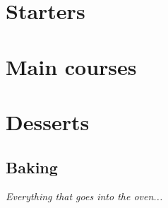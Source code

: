 \documentclass[11pt,paper=a4]{scrbook}
\begin{document}


\tableofcontents                        %


\part{Starters}

\part{Main courses}

\part{Desserts}
\chapter{Baking}
\textit{Everything that goes into the oven...} %



\end{document}
